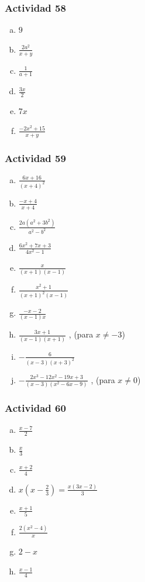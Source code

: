 \documentclass[a4paper, twocolumn]{article}
\begin{document}
\subsubsection*{Actividad 58}
\begin{enumerate}[a)]
\item $9$
\item $\frac{2a^2}{x+y}$
\item $\frac{1}{a+1}$
\item $\frac{3x}{2}$
\item $7x$
\item $\frac{-2x^2 + 15}{x+y}$
\end{enumerate}

\subsubsection*{Actividad 59}
\begin{enumerate}[a)]
\item $\frac{6x+16}{(x+4)^2}$
\item $\frac{-x+4}{x+4}$
\item $\frac{2a(a^2+3b^2)}{a^2 - b^2}$
\item $\frac{6x^2+7x+3}{4x^2-1}$
\item $\frac{x}{(x+1)(x-1)}$
\item $\frac{x^2 + 1}{(x+1)^2(x-1)}$
\item $\frac{-x-2}{(x-1)x}$
\item $\frac{3x+1}{(x-1)(x+1)}$ , (para $x \neq -3$)
\item $-\frac{6}{(x-3)(x+3)^2}$
\item $-\frac{2x^3-12x^2-19x+3}{(x-3)(x^2-6x-9)}$ , (para $x \neq 0$)	
\end{enumerate}

\subsubsection*{Actividad 60}
\begin{enumerate}[a)]
\item $\frac{x-7}{2}$
\item $\frac{x}{3}$
\item $\frac{x+2}{4}$
\item $x(x-\frac{2}{3})= \frac{x(3x-2)}{3}$
\item $\frac{x+1}{5}$
\item $\frac{2(x^2-4)}{x}$
\item $2-x$
\item $\frac{x-1}{4}$
\end{enumerate}
\end{document}
